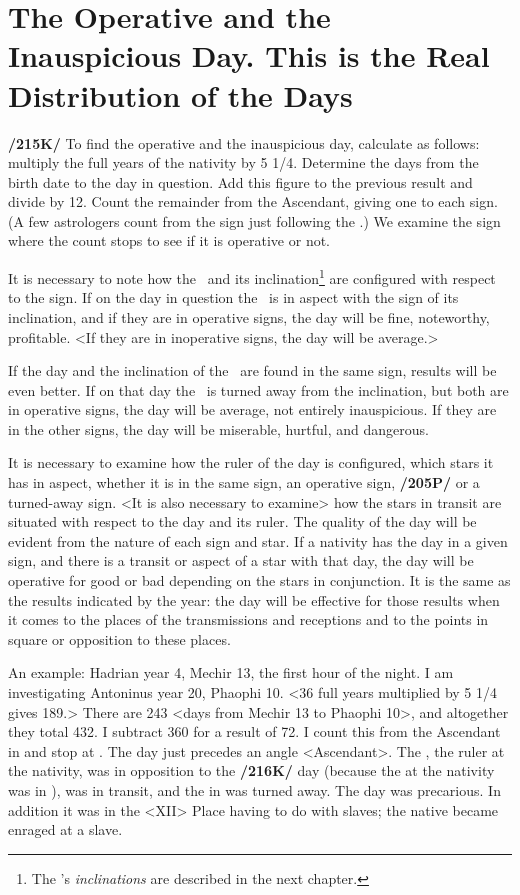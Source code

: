 \section{The Operative and the Inauspicious Day. This is the Real Distribution of the Days}

\textbf{/215K/} To find the operative and the inauspicious day, calculate as follows: multiply the full years of the nativity by 5 1/4. Determine the days from the birth date to the day in question. Add this figure to the previous result and divide by 12. Count the remainder from the Ascendant, giving one to each sign. (A few astrologers count from the sign just following the \Moon.) We examine the sign where the count stops to see if it is operative or not. 

It \mndl  is necessary to note how the \Moon\, and its inclination\footnote{The \Moon's \textsl{inclinations} are described in the next chapter.} are configured with respect to the sign. If on the day in question the \Moon\, is in aspect with the sign of its inclination, and if they are in operative signs, the day will be fine, noteworthy, profitable. <If they are in inoperative signs, the day will be average.>

If the day and the inclination of the \Moon\, are found in the same sign, results will be even better. If on that day the \Moon\, is turned away from the inclination, but both are in operative signs, the day will be average, not entirely inauspicious. If they are in the other signs, the day will be miserable, hurtful, and dangerous.

It \mndl is necessary to examine how the ruler of the day is configured, which stars it has in aspect, whether it is in the same sign, an operative sign, \textbf{/205P/} or a turned-away sign. <It is also necessary to examine> how the stars in transit are situated with respect to the day and its ruler. The quality of the day will be evident from the nature of each sign and star. If a nativity has the day in a given sign, and there is a transit or aspect of a star with that day, the day will be operative for good or bad depending on the stars in conjunction. It is the same as the results indicated by the year: the day will be effective for those results when it comes to the places of the transmissions and receptions and to the points in square or opposition to these places.

An example: Hadrian year 4, Mechir 13, the first hour of the night. I am investigating Antoninus year 20, Phaophi 10. <36 full years multiplied by 5 1/4 gives 189.> There are 243 <days from Mechir 13 to
Phaophi 10>, and altogether they total 432. I subtract 360 for a result of 72. I count this from the Ascendant in \Virgo\xspace and stop at \Leo. The day just precedes an angle <Ascendant>. The \Sun, the ruler at the nativity, was in opposition to the \textbf{/216K/} day (because the \Sun\xspace at the nativity was in \Aquarius), \Mars\xspace was in transit, and the \Moon\xspace in \Capricorn\xspace was turned away. The day was precarious. In addition it was in the <XII> Place having to do with slaves; the native became enraged at a slave.


